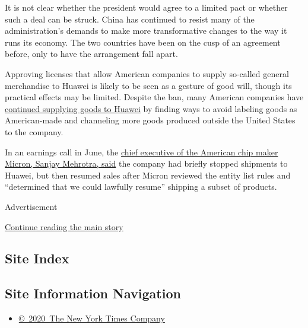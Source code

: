 It is not clear whether the president would agree to a limited pact or
whether such a deal can be struck. China has continued to resist many of
the administration's demands to make more transformative changes to the
way it runs its economy. The two countries have been on the cusp of an
agreement before, only to have the arrangement fall apart.

Approving licenses that allow American companies to supply so-called
general merchandise to Huawei is likely to be seen as a gesture of good
will, though its practical effects may be limited. Despite the ban, many
American companies have
\href{https://www.nytimes.com/2019/06/25/technology/huawei-trump-ban-technology.html}{continued
supplying goods to Huawei} by finding ways to avoid labeling goods as
American-made and channeling more goods produced outside the United
States to the company.

In an earnings call in June, the
\href{https://www.nytimes.com/2019/06/25/technology/huawei-trump-ban-technology.html}{chief
executive of the American chip maker Micron, Sanjay Mehrotra, said} the
company had briefly stopped shipments to Huawei, but then resumed sales
after Micron reviewed the entity list rules and ``determined that we
could lawfully resume'' shipping a subset of products.

Advertisement

\protect\hyperlink{after-bottom}{Continue reading the main story}

\hypertarget{site-index}{%
\subsection{Site Index}\label{site-index}}

\hypertarget{site-information-navigation}{%
\subsection{Site Information
Navigation}\label{site-information-navigation}}

\begin{itemize}
\tightlist
\item
  \href{https://help.nytimes.com/hc/en-us/articles/115014792127-Copyright-notice}{©~2020~The
  New York Times Company}
\end{itemize}


